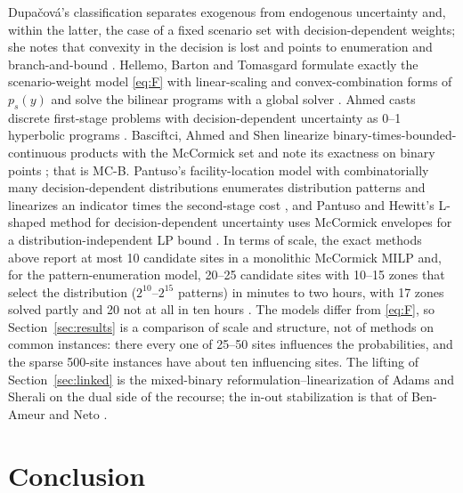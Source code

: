 \documentclass[11pt]{article}
\begin{document}
Dupa\v{c}ov\'a's classification separates exogenous from endogenous uncertainty and, within the latter, the case of a
fixed scenario set with decision-dependent weights; she notes that convexity in the decision is lost and points to
enumeration and branch-and-bound \cite{dupacova}. Hellemo, Barton and Tomasgard formulate exactly the scenario-weight
model \eqref{eq:F} with linear-scaling and convex-combination forms of $p_s(y)$ and solve the bilinear programs with a
global solver \cite{hellemo}. Ahmed casts discrete first-stage problems with decision-dependent uncertainty as 0--1
hyperbolic programs \cite{ahmed}. Basciftci, Ahmed and Shen linearize binary-times-bounded-continuous products with
the McCormick set and note its exactness on binary points \cite{basciftci}; that is \textsc{MC-B}. Pantuso's
facility-location model with combinatorially many decision-dependent distributions enumerates distribution patterns
and linearizes an indicator times the second-stage cost \cite{fl2025}, and Pantuso and Hewitt's L-shaped method for
decision-dependent uncertainty uses McCormick envelopes for a distribution-independent LP bound \cite{pantuso}. In terms of scale, the exact methods above report at most 10 candidate sites in a monolithic McCormick MILP
\cite{basciftci} and, for the pattern-enumeration model, 20--25 candidate sites with 10--15 zones that select the
distribution ($2^{10}$--$2^{15}$ patterns) in minutes to two hours, with 17 zones solved partly and 20 not at all in
ten hours \cite{fl2025}. The models differ from \eqref{eq:F}, so Section~\ref{sec:results} is a comparison of scale
and structure, not of methods on common instances: there every one of 25--50 sites influences the probabilities, and
the sparse 500-site instances have about ten influencing sites. The lifting of Section~\ref{sec:linked} is the mixed-binary
reformulation--linearization of Adams and Sherali \cite{adams-sherali} on the dual side of the recourse; the
in-out stabilization is that of Ben-Ameur and Neto \cite{benameur}.



\section{Conclusion}
\end{document}
